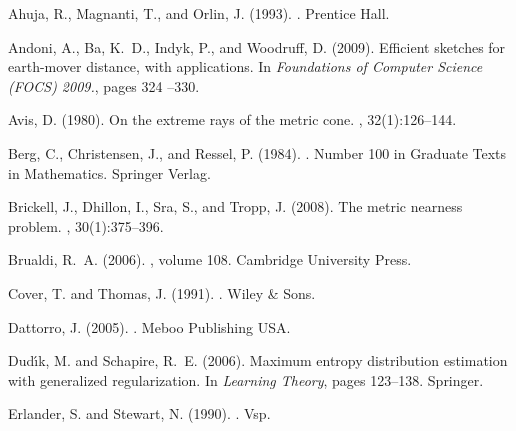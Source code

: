 \documentclass{amsart} %
\begin{document}
{\small{
\begin{thebibliography}{}

Ahuja, R., Magnanti, T., and Orlin, J. (1993).
.
\newblock Prentice Hall.

Andoni, A., Ba, K.~D., Indyk, P., and Woodruff, D. (2009).
\newblock Efficient sketches for earth-mover distance, with applications.
\newblock In {\em Foundations of Computer Science (FOCS) 2009.}, pages 324
  --330.

Avis, D. (1980).
\newblock On the extreme rays of the metric cone.
, 32(1):126--144.

Berg, C., Christensen, J., and Ressel, P. (1984).
.
\newblock Number 100 in Graduate Texts in Mathematics. Springer Verlag.

Brickell, J., Dhillon, I., Sra, S., and Tropp, J. (2008).
\newblock The metric nearness problem.
, 30(1):375--396.

Brualdi, R.~A. (2006).
, volume 108.
\newblock Cambridge University Press.

Cover, T. and Thomas, J. (1991).
.
\newblock Wiley \& Sons.

Dattorro, J. (2005).
.
\newblock Meboo Publishing USA.

Dud{\'\i}k, M. and Schapire, R.~E. (2006).
\newblock Maximum entropy distribution estimation with generalized
  regularization.
\newblock In {\em Learning Theory}, pages 123--138. Springer.

Erlander, S. and Stewart, N. (1990).
.
\newblock Vsp.


\end{thebibliography}}}
\end{document}
